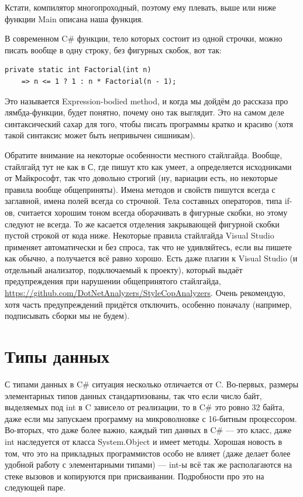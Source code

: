 \documentclass{../../text-style}
\begin{document}
Кстати, компилятор многопроходный, поэтому ему плевать, выше или ниже функции Main описана наша функция.

В современном C\# функции, тело которых состоит из одной строчки, можно писать вообще в одну строку, без фигурных скобок, вот так:

\begin{verbatim}
private static int Factorial(int n) 
    => n <= 1 ? 1 : n * Factorial(n - 1);
\end{verbatim}

Это называется Expression-bodied method, и когда мы дойдём до рассказа про лямбда-функции, будет понятно, почему оно так выглядит. Это на самом деле синтаксический сахар для того, чтобы писать программы кратко и красиво (хотя такой синтаксис может быть непривычен сишникам).

Обратите внимание на некоторые особенности местного стайлгайда. Вообще, стайлгайд тут не как в С, где пишут кто как умеет, а определяется исходниками от Майкрософт, так что довольно строгий (ну, вариации есть, но некоторые правила вообще общеприняты). Имена методов и свойств пишутся всегда с заглавной, имена полей всегда со строчной. Тела составных операторов, типа if-ов, считается хорошим тоном всегда оборачивать в фигурные скобки, но этому следуют не всегда. То же касается отделения закрывающей фигурной скобки пустой строкой от кода ниже. Некоторые правила стайлгайда Visual Studio применяет автоматически и без спроса, так что не удивляйтесь, если вы пишете как обычно, а получается всё равно хорошо. Есть даже плагин к Visual Studio (и отдельный анализатор, подключаемый к проекту), который выдаёт предупреждения при нарушении общепринятого стайлгайда, \url{https://github.com/DotNetAnalyzers/StyleCopAnalyzers}. Очень рекомендую, хотя часть предупреждений придётся отключить, особенно поначалу (например, подписывать сборки мы не будем).

\section{Типы данных}

С типами данных в C\# ситуация несколько отличается от C. Во-первых, размеры элементарных типов данных стандартизованы, так что если число байт, выделяемых под int в C зависело от реализации, то в C\# это ровно 32 байта, даже если мы запускаем программу на микроволновке с 16-битным процессором. Во-вторых, что даже более важно, каждый тип данных в C\# --- это класс, даже int наследуется от класса System.Object и имеет методы. Хорошая новость в том, что это на прикладных программистов особо не влияет (даже делает более удобной работу с элементарными типами) --- int-ы всё так же располагаются на стеке вызовов и копируются при присваивании. Подробности про это на следующей паре.
\end{document}
